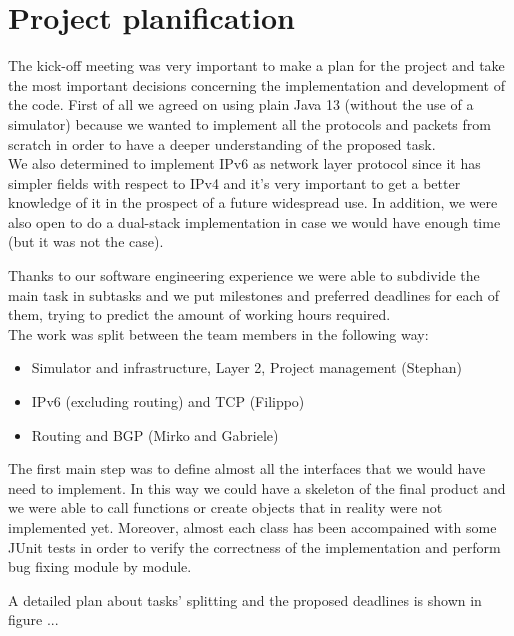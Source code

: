 \chapter{Project planification}

The kick-off meeting was very important to make a plan for the project and take the most important
decisions concerning the implementation and development of the code.
First of all we agreed on using plain Java 13 (without the use of a simulator) because we
wanted to implement all the protocols and packets from scratch in order to have a deeper
understanding of the proposed task.\\
We also determined to implement IPv6 as network layer protocol since it has simpler fields with respect to IPv4 and 
it's very important to get a better knowledge of it in the prospect of a future widespread use. In addition, we were 
also open to do a dual-stack implementation in case we would have enough time (but it was not the case).

Thanks to our software engineering experience we were able to subdivide the main task in 
subtasks and we put milestones and preferred deadlines for each of them, trying to predict
the amount of working hours required.\\
The work was split between the team members in the following way:
\begin{itemize}
    \item Simulator and infrastructure, Layer 2, Project management (Stephan) 
    \item IPv6 (excluding routing) and TCP (Filippo)
    \item Routing and BGP (Mirko and Gabriele)
\end{itemize}

The first main step was to define almost all the interfaces that we would have need to implement.
In this way we could have a skeleton of the final product and we were able to call functions
or create objects that in reality were not implemented yet.
Moreover, almost each class has been accompained with some JUnit tests in order to verify
the correctness of the implementation and perform bug fixing module by module.

A detailed plan about tasks' splitting and the proposed deadlines is shown in figure ...


